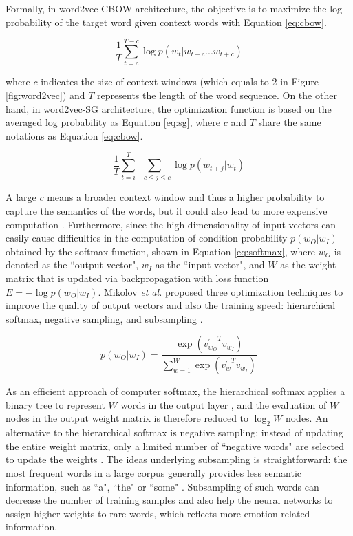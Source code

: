 Formally, in word2vec-CBOW architecture, the objective is to maximize the log probability of the target word given context words with Equation \ref{eq:cbow}.

\begin{equation}
    \frac{1}{T} \sum_{t=c}^{T-c} \log p(w_t | w_{t-c} ... w_{t+c})
    \label{eq:cbow}
\end{equation}

where $c$ indicates the size of context windows (which equals to 2 in Figure \ref{fig:word2vec}) and $T$ represents the length of the word sequence. On the other hand, in word2vec-SG architecture, the optimization function is based on the averaged log probability as Equation \ref{eq:sg}, where $c$ and $T$ share the same notations as Equation \ref{eq:cbow}.

\begin{equation}
    \frac{1}{T} \sum_{t=i}^{T} \sum_{-c\leq j \leq c} \log p(w_{t+j}|w_t)
    \label{eq:sg}
\end{equation}

A large $c$ means a broader context window and thus a higher probability to capture the semantics of the words, but it could also lead to more expensive computation \cite{mikolov2013}. Furthermore, since the high dimensionality of input vectors can easily cause difficulties in the computation of condition probability $p(w_O|w_I)$ obtained by the softmax function, shown in Equation \ref{eq:softmax}, where $w_O$ is denoted as the ``output vector", $w_I$ as the ``input vector", and $W$ as the weight matrix that is updated via backpropagation with loss function $E = -\log p(w_O|w_I)$. Mikolov \textit{et al.} \cite{mikolov2013efficient} proposed three optimization techniques to improve the quality of output vectors and also the training speed: hierarchical softmax, negative sampling, and subsampling \cite{mikolov2013, mikolov2013efficient}. 

\begin{equation}
    p(w_O|w_I) = \frac{\exp({v^{'}_{w_O}}^{T} v_{w_I})}{\sum_{w=1}^{W} \exp({v^{'}_w}^{T} v_{w_{I}})}
    \label{eq:softmax}
\end{equation}

As an efficient approach of computer softmax, the hierarchical softmax applies a binary tree to represent $W$ words in the output layer \cite{mikolov2013}, and the evaluation of $W$ nodes in the output weight matrix is therefore reduced to $\log_2 W$ nodes. An alternative to the hierarchical softmax is negative sampling: instead of updating the entire weight matrix, only a limited number of ``negative words" are selected to update the weights \cite{mikolov2013efficient}. The ideas underlying subsampling is straightforward: the most frequent words in a large corpus generally provides less semantic information, such as ``a", ``the" or ``some" \cite{mikolov2013efficient}. Subsampling of such words can decrease the number of training samples and also help the neural networks to assign higher weights to rare words, which reflects more emotion-related information.

